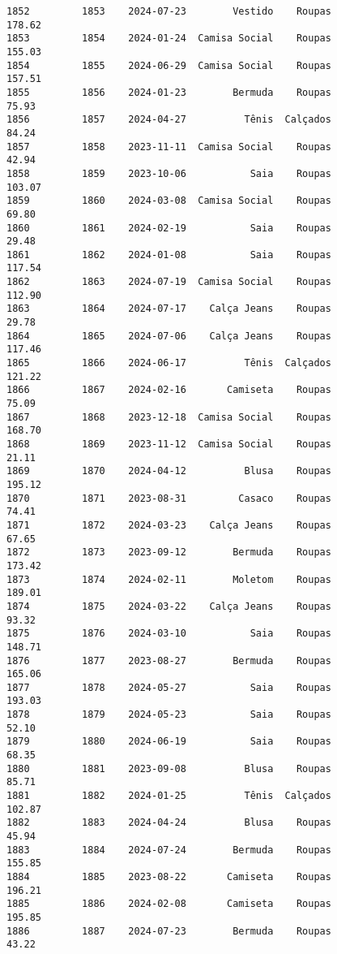 \documentclass[11pt]{article}
\begin{document}
\begin{Verbatim}[commandchars=\\\{\}]
1852         1853    2024-07-23        Vestido    Roupas          178.62   
1853         1854    2024-01-24  Camisa Social    Roupas          155.03   
1854         1855    2024-06-29  Camisa Social    Roupas          157.51   
1855         1856    2024-01-23        Bermuda    Roupas           75.93   
1856         1857    2024-04-27          Tênis  Calçados           84.24   
1857         1858    2023-11-11  Camisa Social    Roupas           42.94   
1858         1859    2023-10-06           Saia    Roupas          103.07   
1859         1860    2024-03-08  Camisa Social    Roupas           69.80   
1860         1861    2024-02-19           Saia    Roupas           29.48   
1861         1862    2024-01-08           Saia    Roupas          117.54   
1862         1863    2024-07-19  Camisa Social    Roupas          112.90   
1863         1864    2024-07-17    Calça Jeans    Roupas           29.78   
1864         1865    2024-07-06    Calça Jeans    Roupas          117.46   
1865         1866    2024-06-17          Tênis  Calçados          121.22   
1866         1867    2024-02-16       Camiseta    Roupas           75.09   
1867         1868    2023-12-18  Camisa Social    Roupas          168.70   
1868         1869    2023-11-12  Camisa Social    Roupas           21.11   
1869         1870    2024-04-12          Blusa    Roupas          195.12   
1870         1871    2023-08-31         Casaco    Roupas           74.41   
1871         1872    2024-03-23    Calça Jeans    Roupas           67.65   
1872         1873    2023-09-12        Bermuda    Roupas          173.42   
1873         1874    2024-02-11        Moletom    Roupas          189.01   
1874         1875    2024-03-22    Calça Jeans    Roupas           93.32   
1875         1876    2024-03-10           Saia    Roupas          148.71   
1876         1877    2023-08-27        Bermuda    Roupas          165.06   
1877         1878    2024-05-27           Saia    Roupas          193.03   
1878         1879    2024-05-23           Saia    Roupas           52.10   
1879         1880    2024-06-19           Saia    Roupas           68.35   
1880         1881    2023-09-08          Blusa    Roupas           85.71   
1881         1882    2024-01-25          Tênis  Calçados          102.87   
1882         1883    2024-04-24          Blusa    Roupas           45.94   
1883         1884    2024-07-24        Bermuda    Roupas          155.85   
1884         1885    2023-08-22       Camiseta    Roupas          196.21   
1885         1886    2024-02-08       Camiseta    Roupas          195.85   
1886         1887    2024-07-23        Bermuda    Roupas           43.22   

\end{Verbatim}
\end{document}
